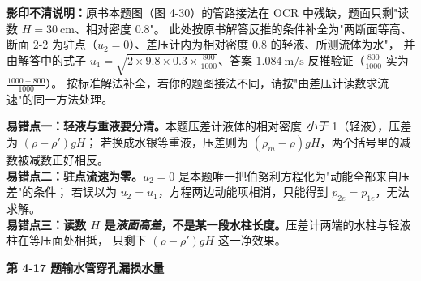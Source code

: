 \begin{tishi}
\textbf{影印不清说明：}原书本题图（图 4-30）的管路接法在 OCR 中残缺，题面只剩"读数 $H=30\ \mathrm{cm}$、相对密度 $0.8$"。
此处按原书解答反推的条件补全为"两断面等高、断面 2-2 为驻点（$u_2=0$）、差压计内为相对密度 0.8 的轻液、所测流体为水"，
并由解答中的式子 $u_1=\sqrt{2\times9.8\times0.3\times\frac{800}{1000}}$、答案 $1.084\ \mathrm{m/s}$ 反推验证（$\frac{800}{1000}$ 实为 $\frac{1000-800}{1000}$）。
按标准解法补全，若你的题图接法不同，请按"由差压计读数求流速"的同一方法处理。
\end{tishi}

\begin{yicuo}
\textbf{易错点一：轻液与重液要分清。}本题压差计液体的相对密度 \emph{小于} 1（轻液），压差为 $(\rho-\rho')gH$；
若换成水银等重液，压差则为 $(\rho_m-\rho)gH$，两个括号里的减数被减数正好相反。\\
\textbf{易错点二：驻点流速为零。}$u_2=0$ 是本题唯一把伯努利方程化为"动能全部来自压差"的条件；
若误以为 $u_2=u_1$，方程两边动能项相消，只能得到 $p_{2e}=p_{1e}$，无法求解。\\
\textbf{易错点三：读数 $H$ 是\emph{液面高差}，不是某一段水柱长度。}压差计两端的水柱与轻液柱在等压面处相抵，
只剩下 $(\rho-\rho')gH$ 这一净效果。
\end{yicuo}

\noindent\textbf{第 4-17 题\quad 输水管穿孔漏损水量}

